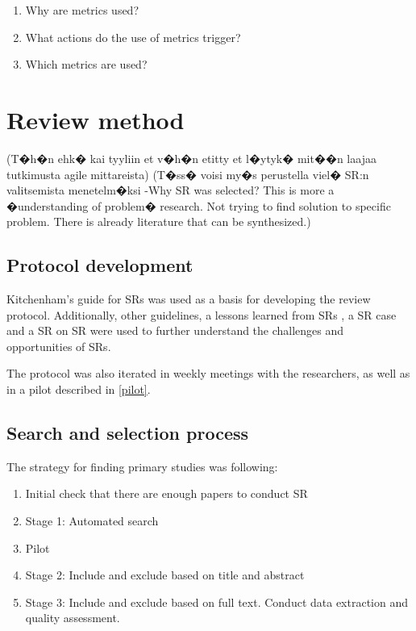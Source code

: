 \documentclass{sig-alternate}
\begin{document}
\begin{enumerate}
  \item Why are metrics used?
  \item What actions do the use of metrics trigger?
  \item Which metrics are used?
\end{enumerate}

\section{Review method}
(T�h�n ehk� kai tyyliin et v�h�n etitty et l�ytyk� mit��n laajaa tutkimusta
agile mittareista) (T�ss� voisi my�s perustella viel� SR:n valitsemista
menetelm�ksi -Why SR was selected? This is more a �understanding of problem�
research. Not trying to find solution to specific problem. There is already
literature that can be synthesized.)


\subsection{Protocol development}
Kitchenham's guide for SRs\cite{kitchenham2004procedures} was used as a basis
for developing the review protocol. Additionally, other
guidelines\cite{webster2002analyzing}, a lessons learned from SRs
\cite{brereton2007lessons}, a SR case\cite{dyba_empirical_2008} and a SR
on SR\cite{kitchenham2013systematic} were used to further understand the
challenges and opportunities of SRs. 

The protocol was also iterated in weekly meetings with the researchers, as
well as in a pilot described in \ref{pilot}.


\subsection{Search and selection process}

The strategy for finding primary studies was following:

\begin{enumerate}
  \item Initial check that there are enough papers to conduct SR
  \item Stage 1: Automated search
  \item Pilot
  \item Stage 2: Include and exclude based on title and abstract
  \item Stage 3: Include and exclude based on full text. Conduct data
  extraction and quality assessment.
\end{enumerate}
\end{document}
